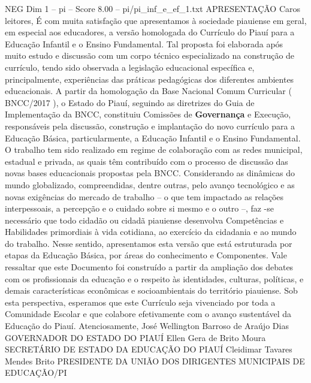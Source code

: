 \begin{textsample}{NEG Dim 1 – pi – Score 8.00 – pi/pi\_inf\_e\_ef\_1.txt}  \label{ex:f1_neg_240}
APRESENTAÇÃO Caros leitores, É com muita satisfação que apresentamos à sociedade piauiense em geral, em especial aos educadores, a versão homologada do Currículo do Piauí para a Educação Infantil e o Ensino Fundamental.
Tal proposta foi elaborada após muito estudo e discussão com um corpo técnico especializado na construção de currículo, tendo sido observada a legislação educacional específica e, principalmente, experiências das práticas pedagógicas dos diferentes ambientes educacionais.
A partir da homologação da Base Nacional Comum Curricular ( BNCC/2017 ), o Estado do Piauí, seguindo as diretrizes do Guia de Implementação da BNCC, constituiu Comissões de \textbf{Governança} e Execução, responsáveis pela discussão, construção e implantação do novo currículo para a Educação Básica, particularmente, a Educação Infantil e o Ensino Fundamental.
O trabalho tem sido realizado em regime de colaboração com as redes municipal, estadual e privada, as quais têm contribuído com o processo de discussão das novas bases educacionais propostas pela BNCC.
Considerando as dinâmicas do mundo globalizado, compreendidas, dentre outras, pelo avanço tecnológico e as novas exigências do mercado de trabalho – o que tem impactado as relações interpessoais, a percepção e o cuidado sobre si mesmo e o outro –, faz -se necessário que todo cidadão ou cidadã piauiense desenvolva Competências e Habilidades primordiais à vida cotidiana, ao exercício da cidadania e ao mundo do trabalho.
Nesse sentido, apresentamos esta versão que está estruturada por etapas da Educação Básica, por áreas do conhecimento e Componentes.
Vale ressaltar que este Documento foi construído a partir da ampliação dos debates com os profissionais da educação e o respeito às identidades, culturas, políticas, e demais características econômicas e socioambientais do território piauiense.
Sob esta perspectiva, esperamos que este Currículo seja vivenciado por toda a Comunidade Escolar e que colabore efetivamente com o avanço sustentável da Educação do Piauí.
Atenciosamente, José Wellington Barroso de Araújo Dias GOVERNADOR DO ESTADO DO PIAUÍ Ellen Gera de Brito Moura SECRETÁRIO DE ESTADO DA EDUCAÇÃO DO PIAUÍ Cleidimar Tavares Mendes Brito PRESIDENTE DA UNIÃO DOS DIRIGENTES MUNICIPAIS DE EDUCAÇÃO/PI

\end{textsample}
